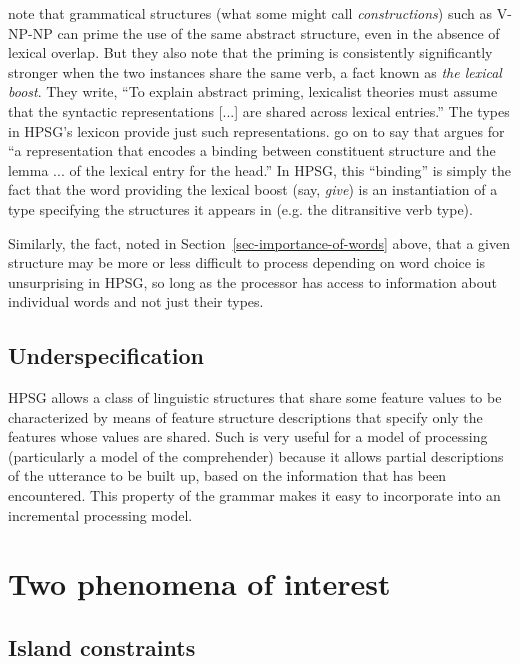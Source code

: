 \documentclass[output=paper
                ,modfonts
                ,nonflat
	        ,collection
	        ,collectionchapter
	        ,collectiontoclongg
 	        ,biblatex
                ,babelshorthands
                ,newtxmath
                ,draftmode
                ,colorlinks, citecolor=brown
]{./langsci/langscibook}
\begin{document}
\citet{BraniganPickering2017} note that grammatical structures (what some might call
\emph{constructions}) such as V-NP-NP can prime the use of the same abstract
structure, even in the absence of lexical overlap.  But they also note that the priming is
consistently significantly stronger when the two instances share the same verb, a fact known as
\emph{the lexical boost}.  They write, ``To explain abstract
priming, lexicalist theories must assume that the syntactic
representations [...]
are shared across lexical entries.''  The types in HPSG's lexicon provide just such representations. \citeauthor{BraniganPickering2017} go on to say that  argues for ``a representation that
encodes a binding between constituent structure and the
lemma ... of the lexical entry for the
head.''  In HPSG, this ``binding'' is simply the fact that the word providing the lexical boost (say, \emph{give}) is an instantiation of a type specifying the structures it appears in (e.g. the ditransitive verb type).

Similarly, the fact, noted in Section~\ref{sec-importance-of-words} above, that a given structure may be more or less difficult to process depending on word choice is unsurprising in HPSG, so long as the processor has access to information about individual words and not just their types.   
\subsection{Underspecification}

HPSG allows a class of linguistic structures that share some feature values to be characterized by means of feature structure descriptions that specify only the features whose values are shared.  Such  is very useful for a model of processing (particularly a model of the comprehender) because it allows partial descriptions of the utterance to be built up, based on the information that has been encountered.  This property of the grammar makes it easy to incorporate into an incremental processing model.

\section{Two phenomena of interest}
\label{sec-phenomena-processing}

\subsection{Island constraints}
\end{document}
